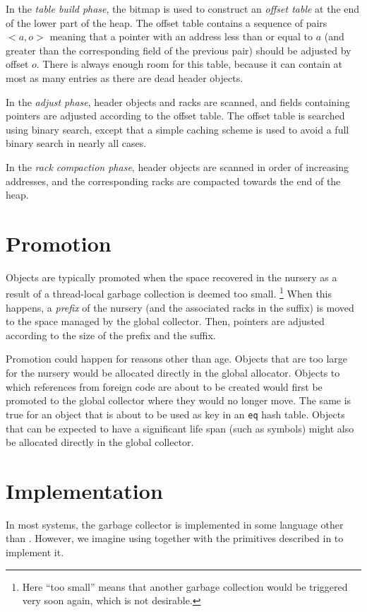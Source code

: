 In the \emph{table build phase}, the bitmap is used to construct an
\emph{offset table} at the end of the lower part of the heap.  The
offset table contains a sequence of pairs $<a,o>$ meaning that a
pointer with an address less than or equal to $a$ (and greater than
the corresponding field of the previous pair) should be adjusted by
offset $o$.  There is always enough room for this table, because it
can contain at most as many entries as there are dead header objects.  

In the \emph{adjust phase}, header objects and racks are
scanned, and fields containing pointers are adjusted according to the
offset table.  The offset table is searched using binary search,
except that a simple caching scheme is used to avoid a full binary
search in nearly all cases. 

In the \emph{rack compaction phase}, header objects are scanned in
order of increasing addresses, and the corresponding racks
are compacted towards the end of the heap.

\section{Promotion}

Objects are typically promoted when the space recovered in the nursery
as a result of a thread-local garbage collection is deemed too small.%
\footnote{Here ``too small'' means that another garbage collection
  would be triggered very soon again, which is not desirable.}  When
this happens, a \emph{prefix} of the nursery (and the associated
racks in the suffix) is moved to the space managed by the
global collector.  Then, pointers are adjusted according to the size
of the prefix and the suffix. 

Promotion could happen for reasons other than age.  Objects that are
too large for the nursery would be allocated directly in the global
allocator.  Objects to which references from foreign code are
about to be created would first be promoted to the global collector
where they would no longer move.  The same is true for an object that
is about to be used as key in an \texttt{eq} hash table.  Objects that
can be expected to have a significant life span (such as symbols)
might also be allocated directly in the global collector. 

\section{Implementation}

In most systems, the garbage collector is implemented in some language
other than \commonlisp{}.  However, we imagine using \commonlisp{} together with the
primitives described in  to
implement it.

